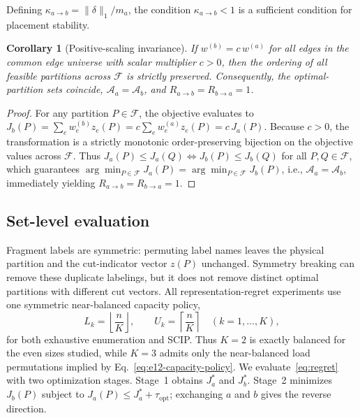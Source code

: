 \documentclass[
  aps,
  pra,
  reprint,
  amsmath,
  amssymb,
  longbibliography,
  nofootinbib,
  floatfix
]{revtex4-2}
\theoremstyle{plain}
\newtheorem{corollary}{Corollary}
\begin{document}
Defining $\kappa_{a\to b}=\|\delta\|_1/m_a$, the condition $\kappa_{a\to b}<1$ is a sufficient condition for placement stability.

\begin{corollary}[Positive-scaling invariance]\label{cor:scaling}
If $w^{(b)}=c\,w^{(a)}$ for all edges in the common edge universe with scalar multiplier $c>0$, then the ordering of all feasible partitions across $\mathcal{F}$ is strictly preserved. Consequently, the optimal-partition sets coincide, $\mathcal{A}_a=\mathcal{A}_b$, and $R_{a\to b}=R_{b\to a}=1$.
\end{corollary}
\begin{proof}
For any partition $P\in\mathcal{F}$, the objective evaluates to $J_b(P)=\sum_e w_e^{(b)}z_e(P)=c\sum_e w_e^{(a)}z_e(P)=c\,J_a(P)$. Because $c>0$, the transformation is a strictly monotonic order-preserving bijection on the objective values across $\mathcal{F}$. Thus $J_a(P)\le J_a(Q)\iff J_b(P)\le J_b(Q)$ for all $P,Q\in\mathcal{F}$, which guarantees $\arg\min_{P\in\mathcal{F}} J_a(P)=\arg\min_{P\in\mathcal{F}} J_b(P)$, i.e., $\mathcal{A}_a=\mathcal{A}_b$, immediately yielding $R_{a\to b}=R_{b\to a}=1$.
\end{proof}

\subsection{Set-level evaluation}
\label{sec:set-eval}

Fragment labels are symmetric: permuting label names leaves the physical partition and the cut-indicator vector $z(P)$ unchanged. Symmetry breaking can remove these duplicate labelings, but it does not remove distinct optimal partitions with different cut vectors. All representation-regret experiments use one symmetric near-balanced capacity policy,
\begin{equation}
  L_k=\left\lfloor\frac{n}{K}\right\rfloor,\qquad
  U_k=\left\lceil\frac{n}{K}\right\rceil
  \quad (k=1,\ldots,K),
  \label{eq:e12-capacity-policy}
\end{equation}
for both exhaustive enumeration and SCIP. Thus $K=2$ is exactly balanced for the even sizes studied, while $K=3$ admits only the near-balanced load permutations implied by Eq.~\eqref{eq:e12-capacity-policy}. We evaluate~\eqref{eq:regret} with two optimization stages. Stage~1 obtains $J_a^*$ and $J_b^*$. Stage~2 minimizes $J_b(P)$ subject to $J_a(P)\le J_a^*+\tau_{\mathrm{opt}}$; exchanging $a$ and $b$ gives the reverse direction.
\end{document}
